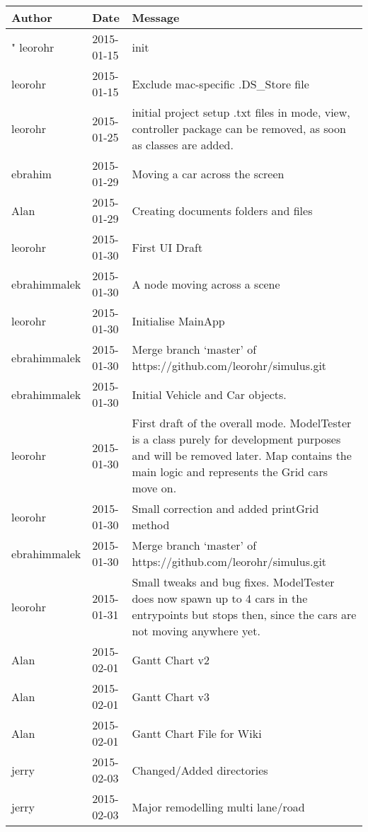 \appendix
\begin{center}
\begin{longtabu} to \textwidth {|
    X[4,l]|
    X[3,c]|
    X[8,l]|}
    \hline
    \textbf{Author} & \textbf{Date} & \textbf{Message} \\ \hline"
leorohr & 2015-01-15 & init \\ \hline
leorohr & 2015-01-15 & Exclude mac-specific .DS\_Store file \\ \hline
leorohr & 2015-01-25 & initial project setup .txt files in mode, view, controller package can be removed, as soon as classes are added. \\ \hline
ebrahim & 2015-01-29 & Moving a car across the screen \\ \hline
Alan & 2015-01-29 & Creating documents folders and files \\ \hline
leorohr & 2015-01-30 & First UI Draft \\ \hline
ebrahimmalek & 2015-01-30 & A node moving across a scene \\ \hline
leorohr & 2015-01-30 & Initialise MainApp \\ \hline
ebrahimmalek & 2015-01-30 & Merge branch `master' of https://github.com/leorohr/simulus.git \\ \hline
ebrahimmalek & 2015-01-30 & Initial Vehicle and Car objects. \\ \hline
leorohr & 2015-01-30 & First draft of the overall mode. ModelTester is a class purely for development purposes and will be removed later. Map contains the main logic and represents the Grid cars move on. \\ \hline
leorohr & 2015-01-30 & Small correction and added printGrid method \\ \hline
ebrahimmalek & 2015-01-30 & Merge branch `master' of https://github.com/leorohr/simulus.git \\ \hline
leorohr & 2015-01-31 & Small tweaks and bug fixes. ModelTester does now spawn up to 4 cars in the entrypoints but stops then, since the cars are not moving anywhere yet. \\ \hline
Alan & 2015-02-01 & Gantt Chart v2 \\ \hline
Alan & 2015-02-01 & Gantt Chart v3 \\ \hline
Alan & 2015-02-01 & Gantt Chart File for Wiki \\ \hline
jerry & 2015-02-03 & Changed/Added directories \\ \hline
jerry & 2015-02-03 & Major remodelling multi lane/road \\ \hline

\end{longtabu}
\end{center}
